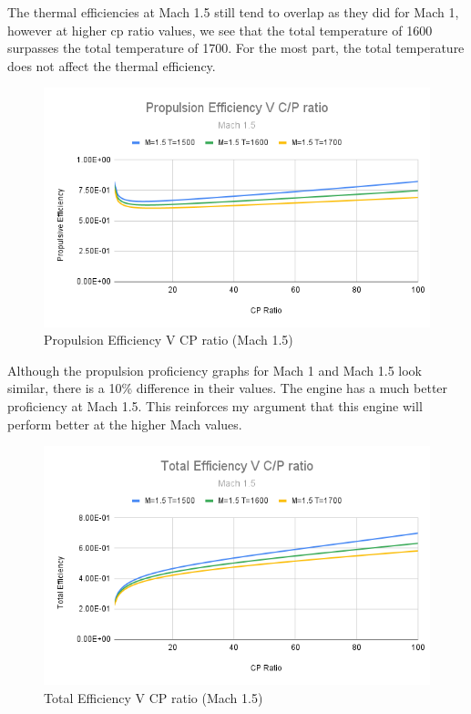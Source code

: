 \documentclass[12pt]{report}
\begin{document}
The thermal efficiencies at Mach 1.5 still tend to overlap as they did for Mach 1, however at higher cp ratio values, we see that the total temperature of 1600 surpasses the total temperature of 1700. For the most part, the total temperature does not affect the thermal efficiency.

\begin{figure}[H]
    \centering
    \includegraphics[width=15.5 cm]{Propulsion Efficiency V C_P ratio (Mach 1.5).png}
    \caption{Propulsion Efficiency V CP ratio (Mach 1.5)}
    \label{fig: Propulsion Efficiency V CP ratio (Mach 1.5)}
\end{figure}

Although the propulsion proficiency graphs for Mach 1 and Mach 1.5 look similar, there is a 10\% difference in their values.  The engine has a much better proficiency at Mach 1.5. This reinforces my argument that this engine will perform better at the higher Mach values.

\begin{figure}[H]
    \centering
    \includegraphics[width=15.5 cm]{Total Efficiency V C_P ratio (Mach 1.5).png}
    \caption{Total Efficiency V CP ratio (Mach 1.5)}
    \label{fig: Total Efficiency V CP ratio (Mach 1.5)}
\end{figure}
\end{document}
